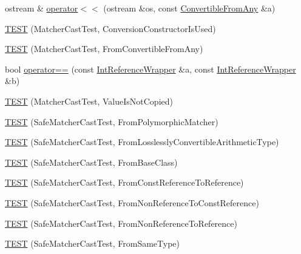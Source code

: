 \begin{DoxyCompactItemize}
\item 
ostream \& \hyperlink{namespacetesting_1_1gmock__matchers__test_a2a2abd1e49c201ae26ed96211d4225eb}{operator$<$$<$} (ostream \&os, const \hyperlink{structtesting_1_1gmock__matchers__test_1_1ConvertibleFromAny}{Convertible\+From\+Any} \&a)
\item 
\hyperlink{namespacetesting_1_1gmock__matchers__test_a42e4d7d26704516436281897cb41bb1b}{T\+E\+ST} (Matcher\+Cast\+Test, Conversion\+Constructor\+Is\+Used)
\item 
\hyperlink{namespacetesting_1_1gmock__matchers__test_ae51787fccc0f0a27e3725039c6cd48dc}{T\+E\+ST} (Matcher\+Cast\+Test, From\+Convertible\+From\+Any)
\item 
bool \hyperlink{namespacetesting_1_1gmock__matchers__test_a33c068c32bf5118e5be92771b146db77}{operator==} (const \hyperlink{structtesting_1_1gmock__matchers__test_1_1IntReferenceWrapper}{Int\+Reference\+Wrapper} \&a, const \hyperlink{structtesting_1_1gmock__matchers__test_1_1IntReferenceWrapper}{Int\+Reference\+Wrapper} \&b)
\item 
\hyperlink{namespacetesting_1_1gmock__matchers__test_ae99c08c8a815964b61f98a4785cf79b5}{T\+E\+ST} (Matcher\+Cast\+Test, Value\+Is\+Not\+Copied)
\item 
\hyperlink{namespacetesting_1_1gmock__matchers__test_a29c04361c022a71711dbf9d3cf2a5050}{T\+E\+ST} (Safe\+Matcher\+Cast\+Test, From\+Polymorphic\+Matcher)
\item 
\hyperlink{namespacetesting_1_1gmock__matchers__test_a70bbe53742db988a828d9e8201e34770}{T\+E\+ST} (Safe\+Matcher\+Cast\+Test, From\+Losslessly\+Convertible\+Arithmetic\+Type)
\item 
\hyperlink{namespacetesting_1_1gmock__matchers__test_a937469149aee65efde526091af1e4f78}{T\+E\+ST} (Safe\+Matcher\+Cast\+Test, From\+Base\+Class)
\item 
\hyperlink{namespacetesting_1_1gmock__matchers__test_a14ba7c67551222321056e4da6708010f}{T\+E\+ST} (Safe\+Matcher\+Cast\+Test, From\+Const\+Reference\+To\+Reference)
\item 
\hyperlink{namespacetesting_1_1gmock__matchers__test_ad53741423311d4f76d9d980f59ec8d65}{T\+E\+ST} (Safe\+Matcher\+Cast\+Test, From\+Non\+Reference\+To\+Const\+Reference)
\item 
\hyperlink{namespacetesting_1_1gmock__matchers__test_a362ce5b2b395dfd6363e4d80b49951f1}{T\+E\+ST} (Safe\+Matcher\+Cast\+Test, From\+Non\+Reference\+To\+Reference)
\item 
\hyperlink{namespacetesting_1_1gmock__matchers__test_a9fc149b429176a45e45267132ae901bd}{T\+E\+ST} (Safe\+Matcher\+Cast\+Test, From\+Same\+Type)

\end{DoxyCompactItemize}

